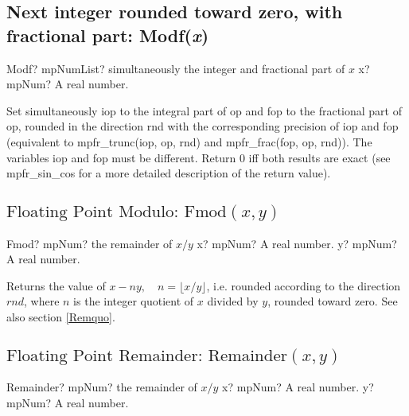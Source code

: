 \subsection{Next integer rounded toward zero, with fractional part: Modf(\textit{x})}

\begin{mpFunctionsExtract}
	\mpFunctionOne
	{Modf? mpNumList? simultaneously the integer and fractional part of $x$}
	{x? mpNum? A real number.}
\end{mpFunctionsExtract}


\vspace{0.3cm}
Set simultaneously iop to the integral part of op and fop to the fractional part of op, rounded in the direction rnd with the corresponding precision of iop and fop (equivalent to mpfr\_trunc(iop, op, rnd) and mpfr\_frac(fop, op, rnd)). The variables iop and fop must be different. Return 0 iff both results are exact (see mpfr\_sin\_cos for a more detailed description of the return value).



\subsection{\texorpdfstring{$\text{Floating Point Modulo: Fmod}(x, y)$}{fmod}}

\begin{mpFunctionsExtract}
	\mpFunctionTwo
	{Fmod? mpNum? the remainder of $x/y$}
	{x? mpNum? A real number.}
	{y? mpNum? A real number.}
\end{mpFunctionsExtract}



\vspace{0.3cm}
Returns the value of $x-ny, \quad n=\lfloor x/y\rfloor$, i.e. rounded according to the direction $rnd$, where $n$ is the integer quotient of $x$ divided by $y$,  rounded toward zero.
See also section \ref{Remquo}.





\subsection{\texorpdfstring{$\text{Floating Point Remainder: Remainder}(x, y)$}{Remainder}}

\begin{mpFunctionsExtract}
	\mpFunctionTwo
	{Remainder? mpNum? the remainder of $x/y$}
	{x? mpNum? A real number.}
	{y? mpNum? A real number.}
\end{mpFunctionsExtract}

